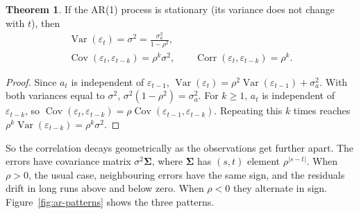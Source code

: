 \documentclass[11pt,a4paper]{article}
\numberwithin{equation}{section}
\theoremstyle{definition}
\newtheorem{thm}{Theorem}[subsection]
\begin{document}
\begin{thm}\label{thm:ar1}
If the AR(1) process is stationary (its variance does not change with $t$), then
\begin{gather*}
\operatorname{Var}(\varepsilon_t) = \sigma^2 = \frac{\sigma_a^2}{1 - \rho^2} , \\
\operatorname{Cov}(\varepsilon_t, \varepsilon_{t-k}) = \rho^k\sigma^2 , \qquad \operatorname{Corr}(\varepsilon_t, \varepsilon_{t-k}) = \rho^k .
\end{gather*}
\end{thm}

\begin{proof}
Since $a_t$ is independent of $\varepsilon_{t-1}$, $\operatorname{Var}(\varepsilon_t) = \rho^2\operatorname{Var}(\varepsilon_{t-1}) + \sigma_a^2$. With both variances equal to $\sigma^2$,
$\sigma^2(1 - \rho^2) = \sigma_a^2$. For $k \ge 1$, $a_t$ is independent of $\varepsilon_{t-k}$, so
$\operatorname{Cov}(\varepsilon_t, \varepsilon_{t-k}) = \rho\operatorname{Cov}(\varepsilon_{t-1}, \varepsilon_{t-k})$. Repeating this $k$ times reaches $\rho^k\operatorname{Var}(\varepsilon_{t-k}) = \rho^k\sigma^2$.
\end{proof}

So the correlation decays geometrically as the observations get further apart. The errors have
covariance matrix $\sigma^2\boldsymbol\Sigma$, where $\boldsymbol\Sigma$ has $(s, t)$ element $\rho^{|s-t|}$. When $\rho > 0$, the usual case,
neighbouring errors have the same sign, and the residuals drift in long runs above and below zero. When $\rho < 0$ they alternate in sign.
Figure~\ref{fig:ar-patterns} shows the three patterns.
\end{document}
